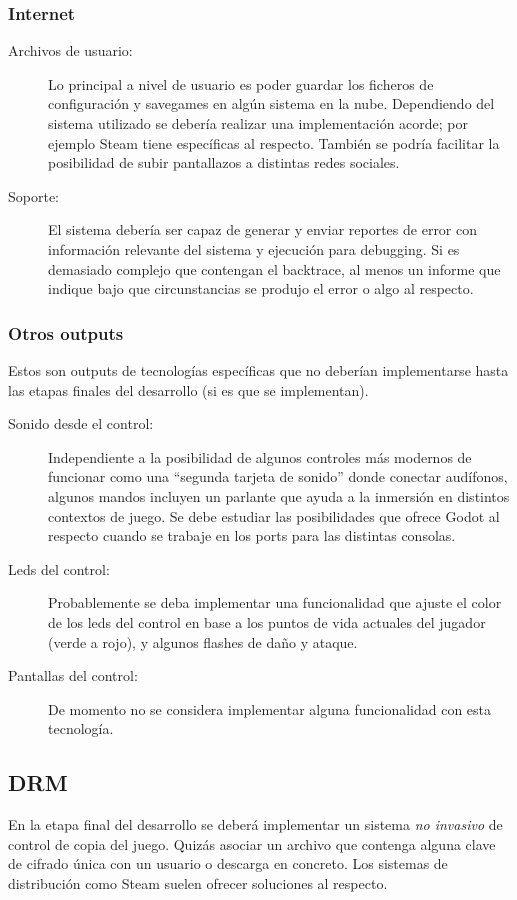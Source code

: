 \subsubsection{Internet}
\begin{description}
\item[Archivos de usuario:] Lo principal a nivel de usuario es poder guardar los ficheros de configuración y savegames en algún sistema en la nube. Dependiendo del sistema utilizado se debería realizar una implementación acorde; por ejemplo Steam tiene  específicas al respecto. También se podría facilitar la posibilidad de subir pantallazos a distintas redes sociales.

\item[Soporte:] El sistema debería ser capaz de generar y enviar reportes de error con información relevante del sistema y ejecución para debugging. Si es demasiado complejo que contengan el backtrace, al menos un informe que indique bajo que circunstancias se produjo el error o algo al respecto.
\end{description}

\subsubsection{Otros outputs}
Estos son outputs de tecnologías específicas que no deberían implementarse hasta las etapas finales del desarrollo (si es que se implementan).

\begin{description}
\item[Sonido desde el control:] Independiente a la posibilidad de algunos controles más modernos de funcionar como una “segunda tarjeta de sonido” donde conectar audífonos, algunos mandos incluyen un parlante que ayuda a la inmersión en distintos contextos de juego. Se debe estudiar las posibilidades que ofrece Godot al respecto cuando se trabaje en los ports para las distintas consolas.

\item[Leds del control:] Probablemente se deba implementar una funcionalidad que ajuste el color de los leds del control en base a los puntos de vida actuales del jugador (verde a rojo), y algunos flashes de daño y ataque.

\item[Pantallas del control:] De momento no se considera implementar alguna funcionalidad con esta tecnología.
\end{description}

\subsection{DRM}
En la etapa final del desarrollo se deberá implementar un sistema \emph{no invasivo} de control de copia del juego. Quizás asociar un archivo que contenga alguna clave de cifrado única con un usuario o descarga en concreto. Los sistemas de distribución como Steam suelen ofrecer soluciones al respecto.